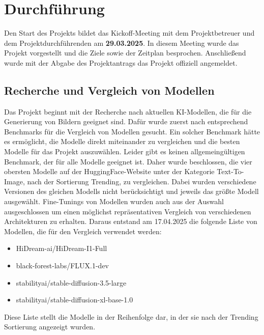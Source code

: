 	\noindent %


\section{Durchführung}
Den Start des Projekts bildet das Kickoff-Meeting mit dem Projektbetreuer und dem Projektdurchführenden am \textbf{29.03.2025}.
In diesem Meeting wurde das Projekt vorgestellt und die Ziele sowie der Zeitplan besprochen. Anschließend wurde mit der Abgabe des Projektantrags das Projekt offiziell angemeldet.
\subsection{Recherche und Vergleich von Modellen}
Das Projekt beginnt mit der Recherche nach aktuellen KI-Modellen, die für die Generierung von Bildern geeignet sind. Dafür wurde zuerst nach entsprechend Benchmarks für die Vergleich von Modellen gesucht. Ein solcher Benchmark hätte es ermöglicht, die Modelle direkt miteinander zu vergleichen und die besten Modelle für das Projekt auszuwählen. Leider gibt es keinen allgemeingültigen Benchmark, der für alle Modelle geeignet ist. Daher wurde beschlossen, die vier obersten Modelle auf der HuggingFace-Website unter der Kategorie Text-To-Image, nach der Sortierung Trending, zu vergleichen. Dabei wurden verschiedene Versionen des gleichen Modells nicht berücksichtigt und jeweils das größte Modell ausgewählt. Fine-Tunings von Modellen wurden auch aus der Auswahl ausgeschlossen um einen möglichst repräsentativen Vergleich von verschiedenen Architekturen zu erhalten. Daraus entstand am 17.04.2025 die folgende Liste von Modellen, die für den Vergleich verwendet werden:
\begin{itemize}
    \item HiDream-ai/HiDream-I1-Full
    \item black-forest-labs/FLUX.1-dev
    \item stabilityai/stable-diffusion-3.5-large
    \item stabilityai/stable-diffusion-xl-base-1.0
\end{itemize}
Diese Liste stellt die Modelle in der Reihenfolge dar, in der sie nach der Trending Sortierung angezeigt wurden.
